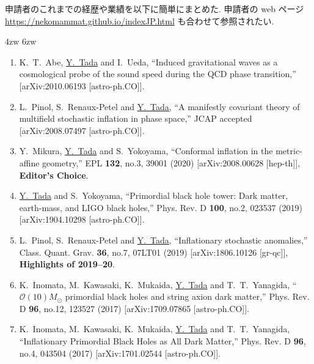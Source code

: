 \documentclass[11pt,a4paper,uplatex,dvipdfmx]{ujarticle} 		%
\newcommand{\研究課題名}{曲率ゆらぎの統計と原始ブラックホール量の精密対応}
\newcommand{\研究機関名}{名古屋大学}
\newcommand{\研究代表者氏名}{多田祐一郎}
\newcommand{\研究期間の最終元号年度}{4}  %
\renewcommand{\emph}[1]{{\sffamily\gtfamily\bfseries #1}}
\begin{document}
\noindent
申請者のこれまでの経歴や業績を以下に簡単にまとめた. 
申請者の web ページ \url{https://nekomammat.github.io/indexJP.html} も合わせて参照されたい.

\begin{description}\itemsep-1mm \itemindent4zw 6zw
	\item[\gtfamily 学術論文 計22報 (以下代表作)]
\end{description}
\vspace{-7mm}
\begin{enumerate}\itemsep-2mm
	\item K.~T.~Abe, \underline{Y.~Tada} and I.~Ueda,
	``Induced gravitational waves as a cosmological probe of the sound speed during the QCD phase transition,''
	[arXiv:2010.06193 [astro-ph.CO]].
	\label{ref: GW QCD}

	\item L.~Pinol, S.~Renaux-Petel and \underline{Y.~Tada},
	``A manifestly covariant theory of multifield stochastic inflation in phase space,''
	JCAP accepted [arXiv:2008.07497 [astro-ph.CO]].
	\label{ref: manifestly covariant}
	
	\item Y.~Mikura, \underline{Y.~Tada} and S.~Yokoyama, 
	``Conformal inflation in the metric-affine geometry,''
	EPL \textbf{132}, no.3, 39001 (2020) 
	[arXiv:2008.00628 [hep-th]], 
	\emph{Editor's Choice}. 
	\label{ref: conformal inflation}
	
	\item \underline{Y.~Tada} and S.~Yokoyama,
	``Primordial black hole tower: Dark matter, earth-mass, and LIGO black holes,''
	Phys. Rev. D \textbf{100}, no.2, 023537 (2019)
	[arXiv:1904.10298 [astro-ph.CO]].
	\label{ref: PBH tower}
	
	\item L.~Pinol, S.~Renaux-Petel and \underline{Y.~Tada}, ``Inflationary stochastic anomalies,''
	Class. Quant. Grav. \textbf{36}, no.7, 07LT01 (2019)
	[arXiv:1806.10126 [gr-qc]],
	\emph{Highlights of 2019--20}.
	\label{ref: stochastic anomaly}
	
	\item K.~Inomata, M.~Kawasaki, K.~Mukaida, \underline{Y.~Tada} and T.~T.~Yanagida,
	``$\mathcal O(10) M_\odot$ primordial black holes and string axion dark matter,''
	Phys. Rev. D \textbf{96}, no.12, 123527 (2017)
	[arXiv:1709.07865 [astro-ph.CO]].
	\label{ref: O(10) PBH}
	
	\item K.~Inomata, M.~Kawasaki, K.~Mukaida, \underline{Y.~Tada} and T.~T.~Yanagida,
	``Inflationary Primordial Black Holes as All Dark Matter,''
	Phys. Rev. D \textbf{96}, no.4, 043504 (2017)
	[arXiv:1701.02544 [astro-ph.CO]].
	\label{ref: PBH DM}


\end{enumerate}
\end{document}
